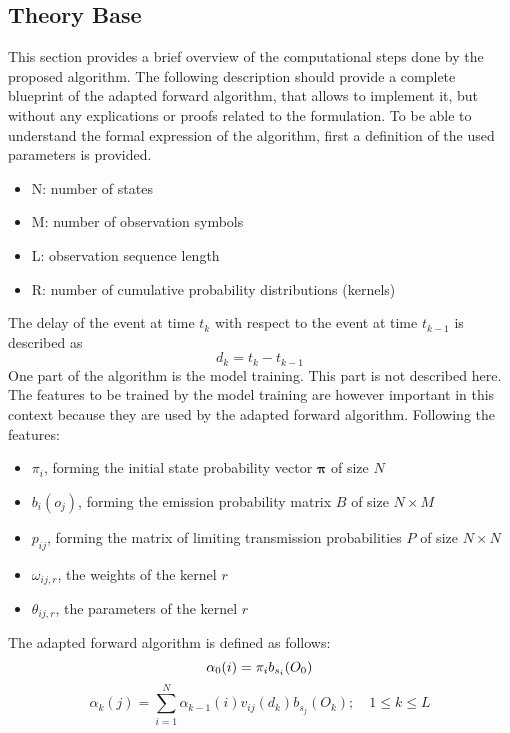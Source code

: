 \documentclass[mscthesis]{usiinfthesis}
\begin{document}
\subsection{Theory Base}
This section provides a brief overview of the computational steps done by the
proposed algorithm. The following description should provide a complete
blueprint of the adapted forward algorithm, that allows to implement it, but
without any explications or proofs related to the formulation. To be able to
understand the formal expression of the algorithm, first a definition of the
used parameters is provided.
\begin{itemize}
    \item N: number of states
    \item M: number of observation symbols
    \item L: observation sequence length
    \item R: number of cumulative probability distributions (kernels)
\end{itemize}
The delay of the event at time $ t_k $ with respect to the event at time
$ t_{k-1} $ is described as
\begin{equation}
    d_k = t_k-t_{k-1}
\end{equation}
One part of the algorithm is the model training. This part is not described
here. The features to be trained by the model training are however important
in this context because they are used by the adapted forward algorithm.
Following the features:
\begin{itemize}
    \item $ \pi_i $, forming the initial state probability vector
        $ \boldsymbol{\pi} $ of size $ N $
    \item $ b_i(o_j) $, forming the emission probability matrix $ B $ of size
        $ N \times M $
    \item $ p_{ij} $, forming the matrix of limiting transmission probabilities
        $ P $ of size $ N \times N $
    \item $ \omega_{ij, r} $, the weights of the kernel $ r $
    \item $ \theta_{ij, r} $, the parameters of the kernel $ r $
\end{itemize}
The adapted forward algorithm is defined as follows:
\begin{equation}
    \label{eq:forward_init}
    \alpha_0(i) = \pi_{i}b_{s_i}(O_0) \\
\end{equation}
\begin{equation}
    \label{eq:forward}
    \alpha_k(j) = \sum_{i=1}^{N} \alpha_{k-1}(i) v_{ij}(d_k) b_{s_j}(O_k);
    \quad 1 \leq k \leq L
\end{equation}
\end{document}
